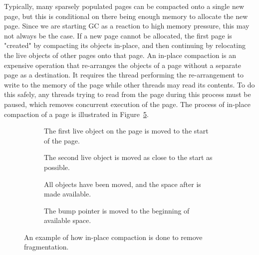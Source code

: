 Typically, many sparsely populated pages can be compacted onto a single new page, but this is conditional on there being enough memory to allocate the new page. Since we are starting GC as a reaction to high memory pressure, this may not always be the case. If a new page cannot be allocated, the first page is "created" by compacting its objects in-place, and then continuing by relocating the live objects of other pages onto that page. An in-place compaction is an expensive operation that re-arranges the objects of a page without a separate page as a destination. It requires the thread performing the re-arrangement to write to the memory of the page while other threads may read its contents. To do this safely, any threads trying to read from the page during this process must be paused, which removes concurrent execution of the page. The process of in-place compaction of a page is illustrated in Figure~\ref{fig:zrel_in}.

\begin{figure}[H]
    \centering
    \begin{subfigure}[t]{.2\textwidth}
        \centering
        
        \caption{The first live object on the page is moved to the start of the page.}
        \label{fig:zrel_in1}
    \end{subfigure}
    \hfill\vline\hfill
    \begin{subfigure}[t]{.2\textwidth}
        \centering
        
        \caption{The second live object is moved as close to the start as possible.}
        \label{fig:zrel_in1}
    \end{subfigure}
    \hfill\vline\hfill
    \begin{subfigure}[t]{.2\textwidth}
        \centering
        
        \caption{All objects have been moved, and the space after is made available.}
        \label{fig:zrel_in1}
    \end{subfigure}
    \hfill\vline\hfill
    \begin{subfigure}[t]{.2\textwidth}
        \centering
        
        \caption{The bump pointer is moved to the beginning of available space.}
        \label{fig:zrel_in1}
    \end{subfigure}
    \caption{An example of how in-place compaction is done to remove fragmentation.}
    \label{fig:zrel_in}
\end{figure}
 
